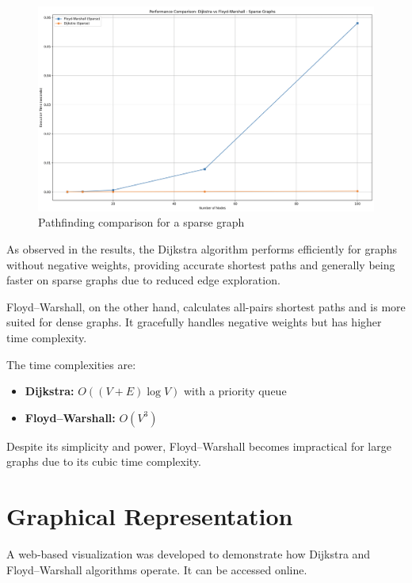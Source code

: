 \documentclass[12pt]{article}
\begin{document}
\begin{figure}[h]
    \centering
    \includegraphics[width=1\textwidth]{images/sparse.png}
    \caption{Pathfinding comparison for a sparse graph}
    \label{fig:w3d11}
\end{figure}

\clearpage

As observed in the results, the Dijkstra algorithm performs efficiently for graphs without negative weights, 
providing accurate shortest paths and generally being faster on sparse graphs due to reduced edge exploration.

Floyd–Warshall, on the other hand, calculates all-pairs shortest paths and is more suited for dense graphs.
It gracefully handles negative weights but has higher time complexity.

The time complexities are:

\begin{itemize}
  \item \textbf{Dijkstra:} \(O((V + E)\log V)\) with a priority queue
  \item \textbf{Floyd–Warshall:} \(O(V^3)\)
\end{itemize}

Despite its simplicity and power, Floyd–Warshall becomes impractical for large graphs due to its cubic time complexity.

\section*{Graphical Representation}
\hspace{0.8cm}
A web-based visualization was developed to demonstrate how Dijkstra and Floyd–Warshall algorithms operate.
It can be accessed online\cite{site}.
\end{document}
